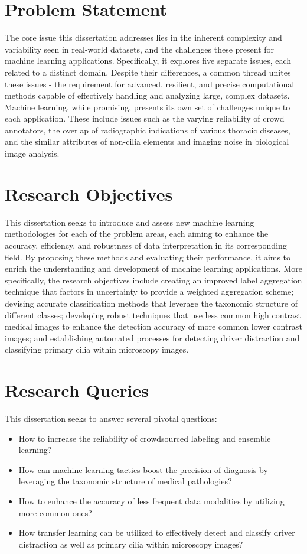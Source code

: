 \section{Problem Statement}
The core issue this dissertation addresses lies in the inherent complexity and variability seen in real-world datasets, and the challenges these present for machine learning applications. Specifically, it explores five separate issues, each related to a distinct domain. Despite their differences, a common thread unites these issues - the requirement for advanced, resilient, and precise computational methods capable of effectively handling and analyzing large, complex datasets. Machine learning, while promising, presents its own set of challenges unique to each application. These include issues such as the varying reliability of crowd annotators, the overlap of radiographic indications of various thoracic diseases, and the similar attributes of non-cilia elements and imaging noise in biological image analysis.

\section{Research Objectives}
This dissertation seeks to introduce and assess new machine learning methodologies for each of the problem areas, each aiming to enhance the accuracy, efficiency, and robustness of data interpretation in its corresponding field. By proposing these methods and evaluating their performance, it aims to enrich the understanding and development of machine learning applications. More specifically, the research objectives include creating an improved label aggregation technique that factors in uncertainty to provide a weighted aggregation scheme; devising accurate classification methods that leverage the taxonomic structure of different classes; developing robust techniques that use less common high contrast medical images to enhance the detection accuracy of more common lower contrast images; and establishing automated processes for detecting driver distraction and classifying primary cilia within microscopy images.

\section{Research Queries}
This dissertation seeks to answer several pivotal questions:
\begin{itemize}
    \item How to increase the reliability of crowdsourced labeling and ensemble learning?
    \item How can machine learning tactics boost the precision of diagnosis by leveraging the taxonomic structure of medical pathologies?
    \item How to enhance the accuracy of less frequent data modalities by utilizing more common ones?
    \item How transfer learning can be utilized to effectively detect and classify driver distraction as well as primary cilia within microscopy images?
\end{itemize}

